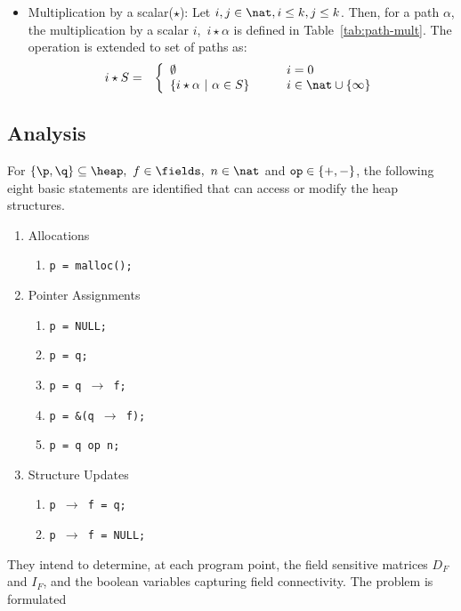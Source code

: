 \begin{itemize}
\item Multiplication by a scalar($\star$): Let $i, j
  \in \nat, i \leq k, j \leq k$. Then, for a path $\alpha$,
  the multiplication by a scalar $i$,\ $i\star\alpha$ is
  defined in Table~\ref{tab:path-mult}. The operation is
  extended to set of paths as:
\begin{eqnarray*}
  i \star {S} &=&   \left\{ \begin{array}{lcl}
    \emptyset &\quad& i = 0 \\
    \{ i\star \alpha \ \vert\ \alpha \in S\} &\quad& i\in \nat \cup \{\infty\} 
  \end{array} \right.
\end{eqnarray*}

\end{itemize}

\subsection{Analysis}
For $\{\p, \q\} \subseteq \heap,\ f \in\fields,\ n \in \nat$
and $\mbox{\tt op} \in \{+, -\}$, 
the following eight basic statements are identified that can access or modify the heap structures. 
\begin{enumerate}
  \item Allocations
  	\begin{enumerate}
    	\item {\tt p = malloc();}
  	\end{enumerate}
  \item Pointer Assignments
  	\begin{enumerate}
    	\item {\tt p = NULL;}
    	\item {\tt p = q;}
    	\item {\tt p = q $\rightarrow$ f;}
    	\item {\tt p = \&(q $\rightarrow$ f);}
    	\item {\tt p = q op n;}
  	\end{enumerate}
  \item Structure Updates
  	\begin{enumerate}
    	\item {\tt p $\rightarrow$ f = q;}
    	\item {\tt p $\rightarrow$ f = NULL;}
  	\end{enumerate}
\end{enumerate}
They intend to determine, at each program point, the field
sensitive matrices $D_F$ and $I_F$, and the
boolean variables capturing field connectivity. The problem is formulated
